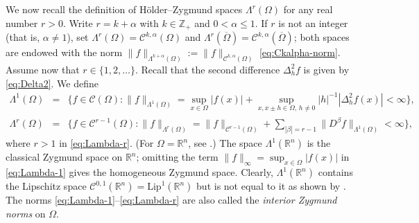 \documentclass[11pt]{amsart}
\numberwithin{equation}{section}
\theoremstyle{definition}
\newcommand\Cscr{\mathscr{C}}
\newcommand\R{\mathbb{R}}
\newcommand\Z{\mathbb{Z}}
\begin{document}
We now recall the definition of H\"older--Zygmund spaces 
$\Lambda^r(\Omega)$ for any real number $r>0$. 
Write $r=k+\alpha$ with $k\in\Z_+$ and 
$0<\alpha\le 1$. If $r$ is not an integer (that is, $\alpha\ne 1$), set 
$\Lambda^r(\Omega)=\Cscr^{k,\alpha}(\Omega)$ and 
$\Lambda^r(\overline \Omega)=\Cscr^{k,\alpha}(\overline \Omega)$;
both spaces are endowed with the norm 
$\|f\|_{\Lambda^{k+\alpha}(\Omega)}:=\|f\|_{\Cscr^{k,\alpha}(\Omega)}$
\eqref{eq:Ckalpha-norm}. Assume now that $r\in \{1,2,\ldots\}$. 
Recall that the second difference $\Delta_h^2 f$ is given 
by \eqref{eq:Delta2}. We define
\begin{eqnarray}\label{eq:Lambda-1}
	\Lambda^1(\Omega) &=& \big\{f\in \Cscr(\Omega):
	\|f\|_{\Lambda^1(\Omega)} = 
	\sup_{x\in\Omega}|f(x)| + \sup_{x,x\pm h\in\Omega,\, h\ne 0}
	|h|^{-1} |\Delta_h^2 f(x)| <\infty \big\}, \\
	\label{eq:Lambda-r}
	\Lambda^r(\Omega) &=&
	\big\{f\in \Cscr^{r-1}(\Omega):
	\|f\|_{\Lambda^r(\Omega)} = \|f\|_{\Cscr^{r-1}(\Omega)} +
	\sum_{|\beta|=r-1} \|D^\beta f\|_{\Lambda^1(\Omega)} <\infty\big\},
\end{eqnarray}
where $r>1$ in \eqref{eq:Lambda-r}. 
(For $\Omega=\R^n$, see 
\cite[Propositions 8 and 9, pp.\ 146--147]{SteinEM1970}.)
The space $\Lambda^1(\R^n)$ is the classical 
Zygmund space on $\R^n$; omitting the term 
$\|f\|_\infty=\sup_{x\in\Omega}|f(x)|$ in \eqref{eq:Lambda-1}
gives the homogeneous Zygmund space.
Clearly, $\Lambda^1(\R^n)$ contains the Lipschitz space 
$\Cscr^{0,1}(\R^n) = \mathrm{Lip}^1(\R^n)$
but is not equal to it as shown by
\cite[Example 4.3.1, p.\ 148]{SteinEM1970}.
The norms \eqref{eq:Lambda-1}--\eqref{eq:Lambda-r}
are also called the {\em interior Zygmund norms} on $\Omega$.
\end{document}
